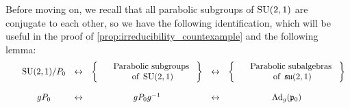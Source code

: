 \documentclass{report}
\begin{document}
Before moving on, we recall that all parabolic subgroups of $\operatorname{{\mathrm{SU}}}(2,1)$ are conjugate to each other, so we have the following identification, which will be useful in the proof of \cref{prop:irreducibility_countexample} and the following lemma:
\[
\begin{array}{cccccc}
    &\operatorname{{\mathrm{SU}}}(2,1)/{P_0} &\leftrightarrow &    \left\{ \begin{array}{cc}
        &\text{ Parabolic subgroups }\\
        &\text{ of } \operatorname{{\mathrm{SU}}}(2,1)
    \end{array} \right\}
 &\leftrightarrow &    \left\{ \begin{array}{cc}
    &\text{ Parabolic subalgebras }\\
    &\text{ of } \operatorname{{\mathfrak{su}}}(2,1)
\end{array} \right\}
\\~\\
    &g P_0 &\leftrightarrow &g P_0 g^{-1} &\leftrightarrow &\operatorname{Ad}_g(\mathfrak p_0)
\end{array}
\]
\end{document}
